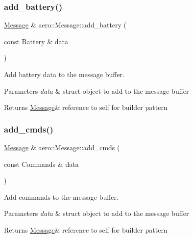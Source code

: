 \subsubsection{\texorpdfstring{add\+\_\+battery()}{add\_battery()}}
{\footnotesize\ttfamily \hyperlink{classaero_1_1Message}{Message} \& aero\+::\+Message\+::add\+\_\+battery (\begin{DoxyParamCaption}\item[{const Battery \&}]{data }\end{DoxyParamCaption})}



Add battery data to the message buffer. 


\begin{DoxyParams}{Parameters}
{\em data} & struct object to add to the message buffer \\
\hline
\end{DoxyParams}
\begin{DoxyReturn}{Returns}
\hyperlink{classaero_1_1Message}{Message}\& reference to self for builder pattern 
\end{DoxyReturn}
\mbox{\label{classaero_1_1Message_ab50e7e98a37bdf7b803ec9fba9b6c787}} 
\subsubsection{\texorpdfstring{add\+\_\+cmds()}{add\_cmds()}}
{\footnotesize\ttfamily \hyperlink{classaero_1_1Message}{Message} \& aero\+::\+Message\+::add\+\_\+cmds (\begin{DoxyParamCaption}\item[{const Commands \&}]{data }\end{DoxyParamCaption})}



Add commands to the message buffer. 


\begin{DoxyParams}{Parameters}
{\em data} & struct object to add to the message buffer \\
\hline
\end{DoxyParams}
\begin{DoxyReturn}{Returns}
\hyperlink{classaero_1_1Message}{Message}\& reference to self for builder pattern 
\end{DoxyReturn}
\mbox{\label{classaero_1_1Message_a23461ffe32d102334c42532445ccb3c7}} 
